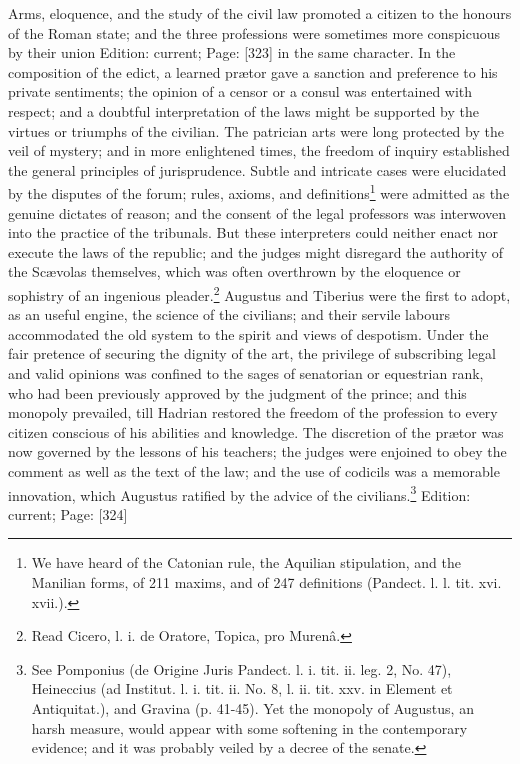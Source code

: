 Arms, eloquence, and the study of the civil law promoted a citizen to the honours of the Roman state; and the three professions were sometimes more conspicuous by their union Edition: current; Page: [323] in the same character. In the composition of the edict, a learned prætor gave a sanction and preference to his private sentiments; the opinion of a censor or a consul was entertained with respect; and a doubtful interpretation of the laws might be supported by the virtues or triumphs of the civilian. The patrician arts were long protected by the veil of mystery; and in more enlightened times, the freedom of inquiry established the general principles of jurisprudence. Subtle and intricate cases were elucidated by the disputes of the forum; rules, axioms, and definitions\footnote{We have heard of the Catonian rule, the Aquilian stipulation, and the Manilian forms, of 211 maxims, and of 247 definitions (Pandect. l. l. tit. xvi. xvii.).} were admitted as the genuine dictates of reason; and the consent of the legal professors was interwoven into the practice of the tribunals. But these interpreters could neither enact nor execute the laws of the republic; and the judges might disregard the authority of the Scævolas themselves, which was often overthrown by the eloquence or sophistry of an ingenious pleader.\footnote{Read Cicero, l. i. de Oratore, Topica, pro Murenâ.} Augustus and Tiberius were the first to adopt, as an useful engine, the science of the civilians; and their servile labours accommodated the old system to the spirit and views of despotism. Under the fair pretence of securing the dignity of the art, the privilege of subscribing legal and valid opinions was confined to the sages of senatorian or equestrian rank, who had been previously approved by the judgment of the prince; and this monopoly prevailed, till Hadrian restored the freedom of the profession to every citizen conscious of his abilities and knowledge. The discretion of the prætor was now governed by the lessons of his teachers; the judges were enjoined to obey the comment as well as the text of the law; and the use of codicils was a memorable innovation, which Augustus ratified by the advice of the civilians.\footnote{See Pomponius (de Origine Juris Pandect. l. i. tit. ii. leg. 2, No. 47), Heineccius (ad Institut. l. i. tit. ii. No. 8, l. ii. tit. xxv. in Element et Antiquitat.), and Gravina (p. 41-45). Yet the monopoly of Augustus, an harsh measure, would appear with some softening in the contemporary evidence; and it was probably veiled by a decree of the senate.}
Edition: current; Page: [324]

